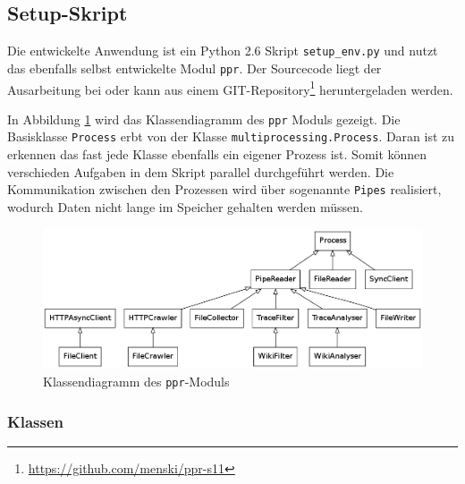 \subsection{Setup-Skript}
\label{sec:setupskript}

Die entwickelte Anwendung ist ein Python 2.6 Skript \texttt{setup\_env.py} und nutzt das ebenfalls selbst entwickelte Modul \texttt{ppr}. Der Sourcecode liegt der Ausarbeitung bei oder kann aus einem GIT-Repository\footnote{\url{https://github.com/menski/ppr-s11}} heruntergeladen werden.

In Abbildung \ref{fig:classes} wird das Klassendiagramm des \texttt{ppr} Moduls gezeigt. Die Basisklasse \texttt{Process} erbt von der Klasse \texttt{multiprocessing.Process}. Daran ist zu erkennen das fast jede Klasse ebenfalls ein eigener Prozess ist. Somit können verschieden Aufgaben in dem Skript parallel durchgeführt werden. Die Kommunikation zwischen den Prozessen wird über sogenannte \texttt{Pipes} realisiert, wodurch Daten nicht lange im Speicher gehalten werden müssen.

\begin{figure}
  \centering
  \includegraphics[width=\textwidth]{images/classes.png}
  \caption{Klassendiagramm des \texttt{ppr}-Moduls}
  \label{fig:classes}
\end{figure}

\subsubsection{Klassen}
\label{sec:klassen}

